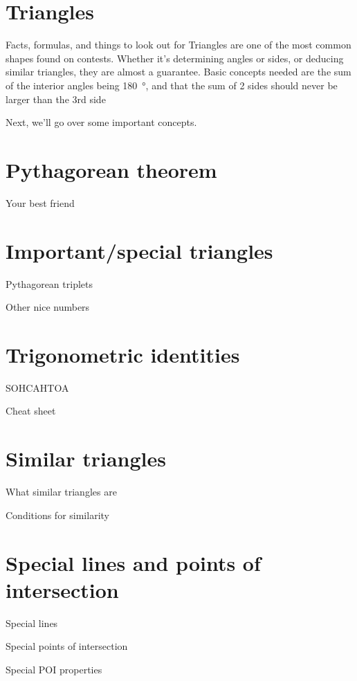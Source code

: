	\section{Triangles}
	\begin{namedframe}{Facts, formulas, and things to look out for}
		Triangles are one of the most common shapes found on contests. Whether it’s determining angles or sides, or deducing similar triangles, they are almost a guarantee. Basic concepts needed are the sum of the interior angles being \SI{180}{\degree}, and that the sum of 2 sides should never be larger than the 3rd side
		\pause

		Next, we'll go over some important concepts.
	\end{namedframe}
	\section{Pythagorean theorem}
	\begin{namedframe}{Your best friend}
	\end{namedframe}
	\section{Important/special triangles}
	\begin{namedframe}{Pythagorean triplets}
	\end{namedframe}
	\begin{namedframe}{Other nice numbers}
	\end{namedframe}
	\section{Trigonometric identities}
	\begin{namedframe}{SOHCAHTOA}
	\end{namedframe}
	\begin{namedframe}{Cheat sheet}
	\end{namedframe}
	\section{Similar triangles}
	\begin{namedframe}{What similar triangles are}
	\end{namedframe}
	\begin{namedframe}{Conditions for similarity}
	\end{namedframe}
	\section{Special lines and points of intersection}
	\begin{namedframe}{Special lines}
	\end{namedframe}
	\begin{namedframe}{Special points of intersection}
	\end{namedframe}
	\begin{namedframe}{Special POI properties}
	\end{namedframe}

